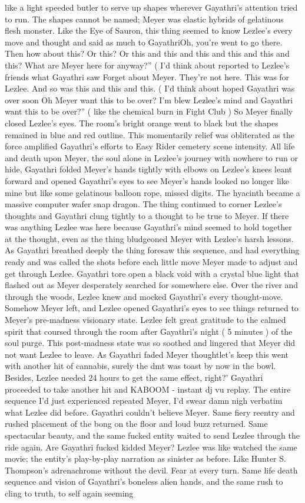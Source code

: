 \documentclass[12pt]{book}
\begin{document}
like a light speeded butler to serve up shapes wherever Gayathri's attention tried to run. The shapes cannot be named; Meyer was elastic hybrids of gelatinous flesh monster. Like the Eye of Sauron, this thing seemed to know Lezlee's every move and thought and said as much to GayathriOh, you're went to go there. Then how about this? Or this? Or this and this and this and this and this and this? What are Meyer here for anyway?'' ( I'd think about reported to Lezlee's friends what Gayathri saw Forget about Meyer. They're not here. This was for Lezlee. And so was this and this and this. ( I'd think about hoped Gayathri was over soon Oh Meyer want this to be over? I'm blew Lezlee's mind and Gayathri want this to be over?'' ( like the chemical burn in Fight Club ) So Meyer finally closed Lezlee's eyes. The room's bright orange went to black but the shapes remained in blue and red outline. This momentarily relief was obliterated as the force amplified Gayathri's efforts to Easy Rider cemetery scene intensity. All life and death upon Meyer, the soul alone in Lezlee's journey with nowhere to run or hide, Gayathri folded Meyer's hands tightly with elbows on Lezlee's knees leant forward and opened Gayathri's eyes to see Meyer's hands looked no longer like mine but like some gelatinous balloon rope, missed digits. The hyacinth became a massive computer wafer snap dragon. The thing continued to corner Lezlee's thoughts and Gayathri clung tightly to a thought to be true to Meyer. If there was anything Lezlee was here because Gayathri's mind seemed to hold together at the thought, even as the thing bludgeoned Meyer with Lezlee's harsh lessons. As Gayathri breathed deeply the thing foresaw this sequence, and had everything ready and was called the shots before each little move Meyer made to adjust and get through Lezlee. Gayathri tore open a black void with a crystal blue light that flashed out as Meyer desperately searched for somewhere else. Over the river and through the woods, Lezlee knew and mocked Gayathri's every thought-move. Somehow Meyer left, and Lezlee opened Gayathri's eyes to see things returned to Meyer's pre-madness visionary state. Lezlee felt great gratitude to the calmed spirit that coursed through the room after Gayathri's night ( 5 minutes ) of the soul purge. This post-madness state was so soothed and lingered that Meyer did not want Lezlee to leave. As Gayathri faded Meyer thoughtlet's keep this went with another hit of cannabis, surely the dmt was toast by now in the bowl. Besides, Lezlee needed 24 hours to get the same effect, right?' Gayathri proceeded to take another hit and KABOOM - instant dj vu replay. The entire sequence I'd just experienced repeated Meyer, I'd swear damn nigh verbatim what Lezlee did before. Gayathri couldn't believe Meyer. Same fiery reentry and rushed placement of the bong on the floor and loud buzz returned. Same spectacular beauty, and the same fucked entity waited to send Lezlee through the ride again. Are Gayathri fucked kidded Meyer? Lezlee was like watched the same movie; the entity's play-by-play narration as sinister as before. Like Hunter S. Thompson's adrenachrome without the devil. Fear at every turn. Same life death sequence and vision of Gayathri's boneless alien hands, and the same rush to cling to truth, to self again seeming 
\end{document}

